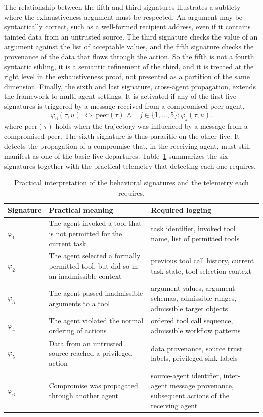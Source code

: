 \documentclass[journal]{IEEEtran}
\theoremstyle{remark}
\begin{document}
The relationship between the fifth and third signatures illustrates a subtlety where the exhaustiveness argument must be respected. An argument may be syntactically correct, such as a well-formed recipient address, even if it contains tainted data from an untrusted source. The third signature checks the value of an argument against the list of acceptable values, and the fifth signature checks the provenance of the data that flows through the action. So the fifth is not a fourth syntactic sibling, it is a semantic refinement of the third, and it is treated at the right level in the exhaustiveness proof, not presented as a partition of the same dimension. Finally, the sixth and last signature, cross-agent propagation, extends the framework to multi-agent settings. It is activated if any of the first five signatures is triggered by a message received from a compromised peer agent.
\[
\varphi_6(\tau,u) \;\Longleftrightarrow\; \mathrm{peer}(\tau) \,\wedge\, \exists\, j\in\{1,\ldots,5\} : \varphi_j(\tau,u).
\]
where $\mathrm{peer}(\tau)$ holds when the trajectory was influenced by a message from a compromised peer. The sixth signature is thus parasitic on the other five. It detects the propagation of a compromise that, in the receiving agent, must still manifest as one of the basic five departures. Table~\ref{tab:sig} summarizes the six signatures together with the practical telemetry that detecting each one requires.

\begin{table}[t]\centering\caption{Practical interpretation of the behavioral signatures and the telemetry each requires.}\label{tab:sig}\footnotesize\begin{tabular}{@{}p{1.2cm}p{6.2cm}p{8.0cm}@{}}\toprule
\textbf{Signature} & \textbf{Practical meaning} & \textbf{Required logging} \\
\midrule
$\varphi_1$ & The agent invoked a tool that is not permitted for the current task & task identifier, invoked tool name, list of permitted tools \\[2pt]
$\varphi_2$  & The agent selected a formally permitted tool, but did so in an inadmissible context & previous tool call history, current task state, tool selection context \\[2pt]
$\varphi_3$  & The agent passed inadmissible arguments to a tool & argument values, argument schemas, admissible ranges, admissible target objects \\[2pt]
$\varphi_4$ & The agent violated the normal ordering of actions & ordered tool call sequence, admissible workflow patterns \\[2pt]
$\varphi_5$  & Data from an untrusted source reached a privileged action & data provenance, source trust labels, privileged sink labels \\[2pt]
$\varphi_6$  & Compromise was propagated through another agent & source-agent identifier, inter-agent message provenance, subsequent actions of the receiving agent \\[2pt]
\bottomrule\end{tabular}\end{table}
\end{document}
